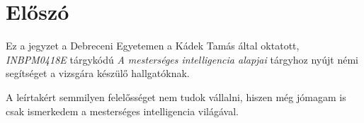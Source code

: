\section*{Előszó}
Ez a jegyzet a Debreceni Egyetemen a Kádek Tamás által oktatott,
\textit{INBPM0418E} tárgykódú \textit{A mesterséges intelligencia alapjai}
tárgyhoz nyújt némi segítséget a vizsgára készülő hallgatóknak.

A leírtakért semmilyen felelősséget nem tudok vállalni, hiszen még jómagam is
csak ismerkedem a mesterséges intelligencia világával.
